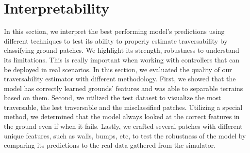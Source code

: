 \documentclass[../document.tex]{subfiles}
\begin{document}
\chapter{Interpretability}
\label{chap: interpretability}
In this section, we interpret the best performing model's predictions using different techniques to test its ability to properly estimate traversability by classifying ground patches. We highlight its strength, robustness to understand its limitations. This is really important when working with controllers that can be deployed in real scenarios. In this section, we evaluated the quality of our traversability estimator with different methodology. First, we showed that the model has correctly learned grounds' features and was able to separable terrains based on them. Second, we utilized the test dataset to visualize the most traversable, the lest traversable and the misclassified patches.  Utilizing a special method, we determined that the model always looked at the correct features in the ground even if when it fails. Lastly, we crafted several patches with different unique features, such as walls, bumps, etc, to test the robustness of the model by comparing its predictions to the real data gathered from the simulator. 
\end{document}
